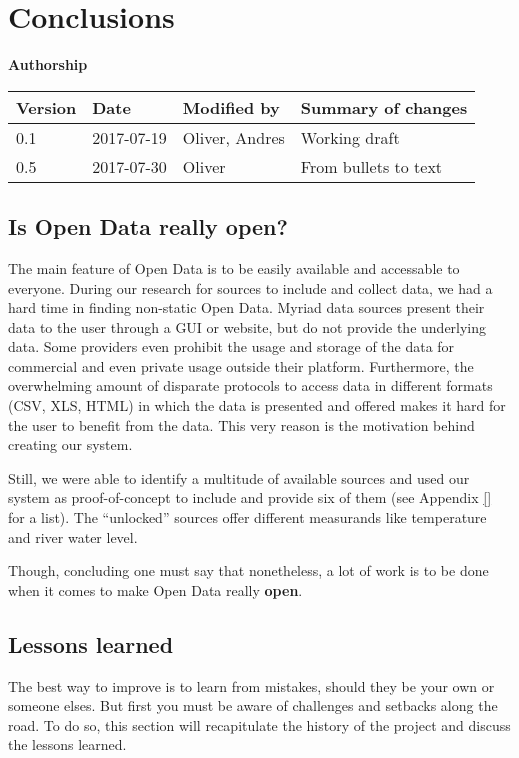 \section{Conclusions}\label{sec:conclusions}

\textbf{Authorship}

\begin{longtable}{@{}llll@{}}
\toprule
Version & Date & Modified by & Summary of changes\tabularnewline
\midrule
\endhead
0.1 & 2017-07-19 & Oliver, Andres & Working draft\tabularnewline
0.5 & 2017-07-30 & Oliver & From bullets to text\tabularnewline
\bottomrule
\end{longtable}

\subsection{Is Open Data really open?}\label{is-open-data-really-open}

The main feature of Open Data is to be easily available and accessable to everyone. During our research for sources to include and collect data, we had a hard time in finding non-static Open Data. Myriad data sources present their data to the user through a GUI or website, but do not provide the underlying data. Some providers even prohibit the usage and storage of the data for commercial and even private usage outside their platform. Furthermore, the overwhelming amount of disparate protocols to access data in different formats (CSV, XLS, HTML) in which the data is presented and offered makes it hard for the user to benefit from the data. This very reason is the motivation behind creating our system.

Still, we were able to identify a multitude of available sources and used our system as proof-of-concept to include and provide six of them (see Appendix \ref{} for a list). The "`unlocked"' sources offer different measurands like temperature and river water level.

Though, concluding one must say that nonetheless, a lot of work is to be done when it comes to make Open Data really \textbf{open}.

\subsection{Lessons learned}\label{lessons-learned}

The best way to improve is to learn from mistakes, should they be your own or someone elses. But first you must be aware of challenges and setbacks along the road. To do so, this section will recapitulate the history of the project and discuss the lessons learned.

